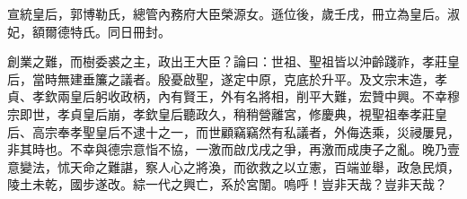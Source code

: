 \begin{pinyinscope}
宣統皇后，郭博勒氏，總管內務府大臣榮源女。遜位後，歲壬戌，冊立為皇后。淑妃，額爾德特氏。同日冊封。

創業之難，而樹委裘之主，政出王大臣？論曰：世祖、聖祖皆以沖齡踐祚，孝莊皇后，當時無建垂簾之議者。殷憂啟聖，遂定中原，克底於升平。及文宗末造，孝貞、孝欽兩皇后躬收政柄，內有賢王，外有名將相，削平大難，宏贊中興。不幸穆宗即世，孝貞皇后崩，孝欽皇后聽政久，稍稍營離宮，修慶典，視聖祖奉孝莊皇后、高宗奉孝聖皇后不逮十之一，而世顧竊竊然有私議者，外侮迭乘，災祲屢見，非其時也。不幸與德宗意恉不協，一激而啟戊戌之爭，再激而成庚子之亂。晚乃壹意變法，怵天命之難諶，察人心之將渙，而欲救之以立憲，百端並舉，政急民煩，陵土未乾，國步遂改。綜一代之興亡，系於宮闈。嗚呼！豈非天哉？豈非天哉？


\end{pinyinscope}